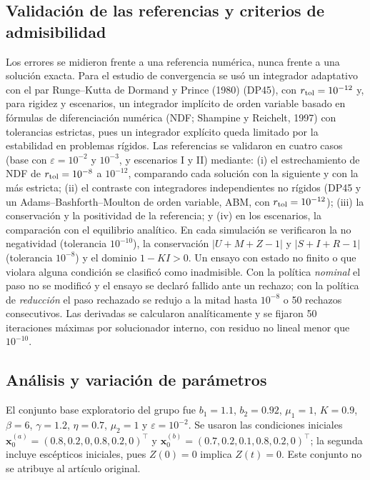 \subsection{Validación de las referencias y criterios de admisibilidad}
Los errores se midieron frente a una referencia numérica, nunca frente a una solución exacta. Para el estudio de convergencia se usó un integrador adaptativo con el par Runge--Kutta de Dormand y Prince (1980) (DP45), con $r_{\rm tol}=10^{-12}$ y, para rigidez y escenarios, un integrador implícito de orden variable basado en fórmulas de diferenciación numérica (NDF; Shampine y Reichelt, 1997) con tolerancias estrictas, pues un integrador explícito queda limitado por la estabilidad en problemas rígidos. Las referencias se validaron en cuatro casos (base con $\varepsilon=10^{-2}$ y $10^{-3}$, y escenarios I y II) mediante: (i) el estrechamiento de NDF de $r_{\rm tol}=10^{-8}$ a $10^{-12}$, comparando cada solución con la siguiente y con la más estricta; (ii) el contraste con integradores independientes no rígidos (DP45 y un Adams--Bashforth--Moulton de orden variable, ABM, con $r_{\rm tol}=10^{-12}$); (iii) la conservación y la positividad de la referencia; y (iv) en los escenarios, la comparación con el equilibrio analítico. En cada simulación se verificaron la no negatividad (tolerancia $10^{-10}$), la conservación $|U+M+Z-1|$ y $|S+I+R-1|$ (tolerancia $10^{-8}$) y el dominio $1-KI>0$. Un ensayo con estado no finito o que violara alguna condición se clasificó como inadmisible. Con la política \emph{nominal} el paso no se modificó y el ensayo se declaró fallido ante un rechazo; con la política de \emph{reducción} el paso rechazado se redujo a la mitad hasta $10^{-8}$ o 50 rechazos consecutivos. Las derivadas se calcularon analíticamente y se fijaron 50 iteraciones máximas por solucionador interno, con residuo no lineal menor que $10^{-10}$.

\subsection{Análisis y variación de parámetros}
El conjunto base exploratorio del grupo fue $b_1=1.1$, $b_2=0.92$, $\mu_1=1$, $K=0.9$, $\beta=6$, $\gamma=1.2$, $\eta=0.7$, $\mu_2=1$ y $\varepsilon=10^{-2}$. Se usaron las condiciones iniciales $\mathbf x_0^{(a)}=(0.8,0.2,0,0.8,0.2,0)^\top$ y $\mathbf x_0^{(b)}=(0.7,0.2,0.1,0.8,0.2,0)^\top$; la segunda incluye escépticos iniciales, pues $Z(0)=0$ implica $Z(t)=0$. Este conjunto no se atribuye al artículo original.

